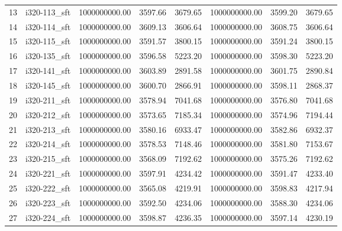 \begin{tabular}{llrrrrrr}
13 &  i320-113\_sft &    1000000000.00 &              3597.66 &        3679.65 &    1000000000.00 &              3599.20 &        3679.65 \\
14 &  i320-114\_sft &    1000000000.00 &              3609.13 &        3606.64 &    1000000000.00 &              3608.75 &        3606.64 \\
15 &  i320-115\_sft &    1000000000.00 &              3591.57 &        3800.15 &    1000000000.00 &              3591.24 &        3800.15 \\
16 &  i320-135\_sft &    1000000000.00 &              3596.58 &        5223.20 &    1000000000.00 &              3598.30 &        5223.20 \\
17 &  i320-141\_sft &    1000000000.00 &              3603.89 &        2891.58 &    1000000000.00 &              3601.75 &        2890.84 \\
18 &  i320-145\_sft &    1000000000.00 &              3600.70 &        2866.91 &    1000000000.00 &              3598.11 &        2868.37 \\
19 &  i320-211\_sft &    1000000000.00 &              3578.94 &        7041.68 &    1000000000.00 &              3576.80 &        7041.68 \\
20 &  i320-212\_sft &    1000000000.00 &              3573.65 &        7185.34 &    1000000000.00 &              3574.96 &        7194.44 \\
21 &  i320-213\_sft &    1000000000.00 &              3580.16 &        6933.47 &    1000000000.00 &              3582.86 &        6932.37 \\
22 &  i320-214\_sft &    1000000000.00 &              3578.53 &        7148.46 &    1000000000.00 &              3581.80 &        7153.67 \\
23 &  i320-215\_sft &    1000000000.00 &              3568.09 &        7192.62 &    1000000000.00 &              3575.26 &        7192.62 \\
24 &  i320-221\_sft &    1000000000.00 &              3597.91 &        4234.42 &    1000000000.00 &              3591.47 &        4233.40 \\
25 &  i320-222\_sft &    1000000000.00 &              3565.08 &        4219.91 &    1000000000.00 &              3598.83 &        4217.94 \\
26 &  i320-223\_sft &    1000000000.00 &              3592.50 &        4234.06 &    1000000000.00 &              3588.30 &        4234.06 \\
27 &  i320-224\_sft &    1000000000.00 &              3598.87 &        4236.35 &    1000000000.00 &              3597.14 &        4230.19 \\

\end{tabular}
